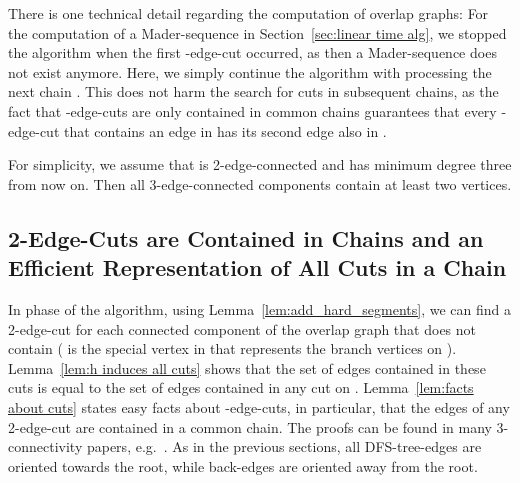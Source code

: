 \documentclass[paper=a4]{scrartcl}
\begin{document}
There is one technical detail regarding the computation of overlap graphs: For the computation of a Mader-sequence in Section~\ref{sec:linear time alg}, we stopped the algorithm when the first -edge-cut occurred, as then a Mader-sequence does not exist anymore. Here, we simply continue the algorithm with processing the next chain . This does not harm the search for cuts in subsequent chains, as the fact that -edge-cuts are only contained in common chains guarantees that every -edge-cut that contains an edge  in  has its second edge also in .


For simplicity, we assume that  is 2-edge-connected and has minimum degree three from now on. Then all 3-edge-connected components contain at least two vertices. 


\subsection{2-Edge-Cuts are Contained in Chains and an Efficient Representation of All Cuts in a Chain}\label{sec:efficient cut representation}

In phase  of the algorithm, using Lemma~\ref{lem:add_hard_segments}, we can find a 2-edge-cut for each connected component of the overlap graph  that does not contain  ( is the special vertex in  that represents the branch vertices on ). Lemma~\ref{lem:h induces all cuts} shows that the set of edges contained in these cuts is equal to the set of edges contained in any cut on .
Lemma~\ref{lem:facts about cuts} states easy facts about -edge-cuts, in particular, that the edges of any 2-edge-cut are contained in a common chain. The proofs can be found in many 3-connectivity papers, e.g.~\cite{Nagamochi1992a,Taoka1992,Tsin2007,Tsin2009}. As in the previous sections, all DFS-tree-edges are oriented towards the root, while back-edges are oriented away from the root.
\end{document}
